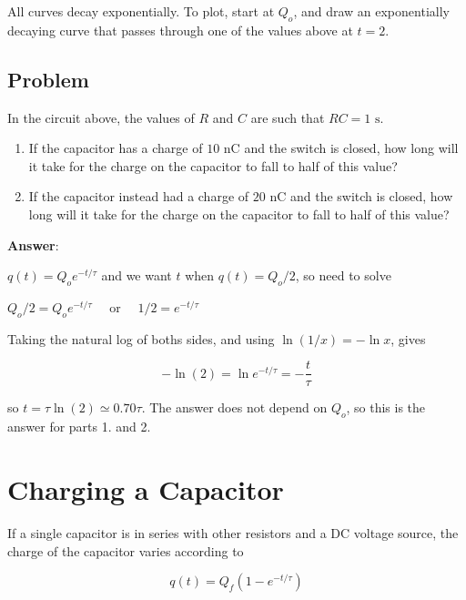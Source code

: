 \documentclass{article}
\begin{document}
All curves decay exponentially. To plot, start at $Q_o$, and draw an exponentially decaying curve that passes through one of the values above at $t=2$.
\fi

\subsection{Problem}



In the circuit above, the values of $R$ and $C$ are such that $RC=1\text{ s}$.

\begin{enumerate}

  \item If the capacitor has a charge of $10\text{ nC}$ and the switch is closed, how long will it take for the charge on the capacitor to fall to half of this value?

  \item If the capacitor instead had a charge of $20\text{ nC}$ and the switch is closed, how long will it take for the charge on the capacitor to fall to half of this value?

\end{enumerate}

\ifsolutions
\textbf{Answer}:

$q(t)=Q_oe^{-t/\tau}$ and we want $t$ when $q(t)=Q_o/2$, so need to solve 

$Q_o/2=Q_oe^{-t/\tau}\quad$ or $\quad 1/2=e^{-t/\tau}$

Taking the natural log of boths sides, and using $\ln(1/x)=-\ln x$, gives

\begin{equation}
-\ln(2) = \ln e^{-t/\tau} = -\frac{t}{\tau}
\end{equation}

so $t=\tau\ln(2)\simeq 0.70\tau$. The answer does not depend on $Q_o$, so this is the answer for parts 1. and 2.
\else

\newpage
\fi
\ifsolutions\else
\newpage
\fi

\section{Charging a Capacitor}

If a single capacitor is in series with other resistors and a DC voltage source, the charge of the capacitor varies according to 

\begin{equation}
q(t)=Q_f(1-e^{-t/\tau})
\end{equation}
\end{document}
